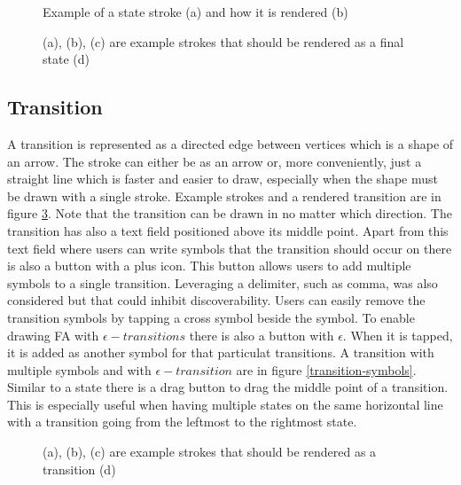 \begin{figure}
    \centering
    \caption{Example of a state stroke (a) and how it is rendered (b)}\label{state}
\end{figure}

\begin{figure}
    \centering
    \caption{(a), (b), (c) are example strokes that should be rendered as a final state (d)}\label{final-state}
\end{figure}

\subsection{Transition}

A transition is represented as a directed edge between vertices which is a shape of an arrow. The stroke can either be as an arrow or, more conveniently, just a straight line which is faster and easier to draw, especially when the shape must be drawn with a single stroke. Example strokes and a rendered transition are in figure \ref{transition}. Note that the transition can be drawn in no matter which direction. The transition has also a text field positioned above its middle point. Apart from this text field where users can write symbols that the transition should occur on there is also a button with a plus icon. This button allows users to add multiple symbols to a single transition. Leveraging a delimiter, such as comma, was also considered but that could inhibit discoverability. Users can easily remove the transition symbols by tapping a cross symbol beside the symbol. To enable drawing FA with $\epsilon-transitions$ there is also a button with $\epsilon$. When it is tapped, it is added as another symbol for that particulat transitions. A transition with multiple symbols and with $\epsilon-transition$ are in figure \ref{transition-symbols}. Similar to a state there is a drag button to drag the middle point of a transition. This is especially useful when having multiple states on the same horizontal line with a transition going from the leftmost to the rightmost state.

\begin{figure}
    \centering
    \caption{(a), (b), (c) are example strokes that should be rendered as a transition (d)}\label{transition}
\end{figure}

